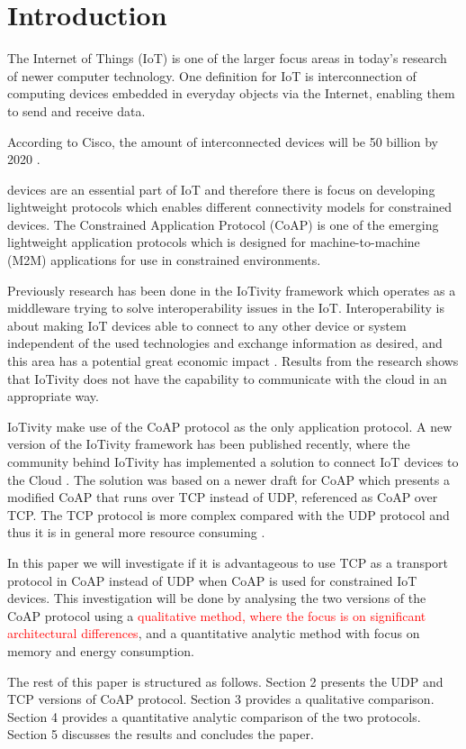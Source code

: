 \section{Introduction}
The Internet of Things (IoT) is one of the larger focus areas in today's research of newer computer technology. One definition for IoT is interconnection of computing devices embedded in everyday objects via the Internet, enabling them to send and receive data.

According to Cisco, the amount of interconnected devices will be 50 billion by 2020 \cite{ciscoiot:online} \cite{Inter74:online}.

 devices are an essential part of IoT and therefore there is focus on developing lightweight protocols which enables different connectivity models for constrained devices.  
The Constrained Application Protocol (CoAP) \cite{rfc7252} is one of the emerging lightweight application protocols which is designed for machine-to-machine (M2M) applications for use in constrained environments.   

Previously research has been done \cite{interoperabilityChallenge} in the IoTivity framework which operates as a middleware trying to solve interoperability issues in the IoT. Interoperability is about making IoT devices able to connect to any other device or system independent of the used technologies and exchange information as desired, and this area has a potential great economic impact \cite{Unloc34:online}. 
Results from the research shows that IoTivity does not have the capability to communicate with the cloud in an appropriate way. 

IoTivity make use of the CoAP protocol as the only application protocol. 
A new version of the IoTivity framework has been published recently, where the community behind IoTivity has implemented a solution to connect IoT devices to the Cloud \cite{IoTiv3:online}. The solution was based on a newer draft for CoAP \cite{ietf-core-coap-tcp-tls-02} which presents a modified CoAP that runs over TCP instead of UDP, referenced as CoAP over TCP.
The TCP protocol is more complex compared with the UDP protocol and thus it is in general more resource consuming \cite{giannoulis2009tcp}.


In this paper we will investigate if it is advantageous to use TCP as a transport protocol in CoAP instead of UDP when CoAP is used for constrained IoT devices. This investigation will be done by analysing the two versions of the CoAP protocol using a \textcolor{red}{qualitative method, where the focus is on significant architectural differences}, and a quantitative analytic method with focus on memory and energy consumption. 

The rest of this paper is structured as follows.  Section 2 presents the UDP and TCP versions of CoAP protocol. Section 3 provides a qualitative comparison. Section 4 provides a quantitative analytic comparison of the two protocols. Section 5 discusses the results and concludes the paper.     
